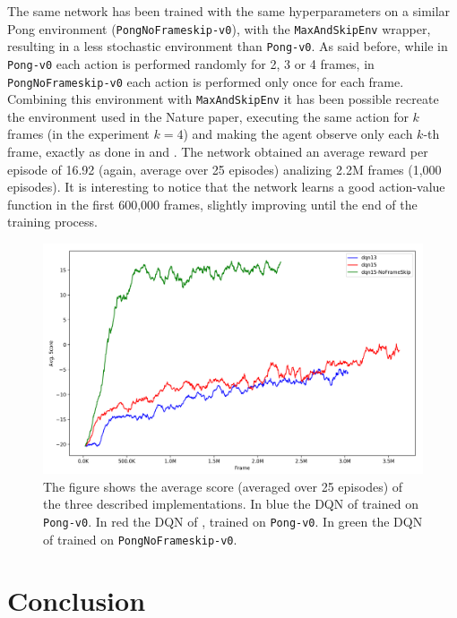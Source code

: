 \documentclass[a4paper]{article}
\numberwithin{equation}{section} %
\numberwithin{figure}{section} %
\numberwithin{table}{section} %
\theoremstyle{definition}
\begin{document}
The same network has been trained with the same hyperparameters on a similar
Pong environment (\texttt{PongNoFrameskip-v0}), with the \texttt{MaxAndSkipEnv}
wrapper, resulting in a less stochastic environment than \texttt{Pong-v0}. As
said before, while in \texttt{Pong-v0} each action is performed randomly for 2, 3
or 4 frames, in \texttt{PongNoFrameskip-v0} each action is performed only once
for each frame. Combining this environment with \texttt{MaxAndSkipEnv} it has been
possible recreate the environment used in the Nature paper, executing the
same action for $k$ frames (in the experiment $k=4$) and
making the agent observe only each $k$-th frame, exactly as done in \cite{mnih2013playing}
and \cite{mnih2015humanlevel}. The network obtained an average reward per episode
of 16.92 (again, average over 25 episodes) analizing 2.2M frames (1,000 episodes).
It is interesting to notice that the network learns a good action-value function
in the first 600,000 frames, slightly improving until the end of the training process.

\begin{figure}
	\centering
	\includegraphics[width=1.0\linewidth]{images/dqn-results-pong.png}
	\caption{The figure shows the average score (averaged over 25 episodes) of
		the three described implementations. In blue the DQN of \cite{mnih2013playing}
		trained on \texttt{Pong-v0}.
		In red the DQN of \cite{mnih2015humanlevel}, trained on
		\texttt{Pong-v0}. In green the DQN of \cite{mnih2015humanlevel} trained
		on \texttt{PongNoFrameskip-v0}.}
	\label{fig:experiments}
\end{figure}


\section{Conclusion}
\end{document}
